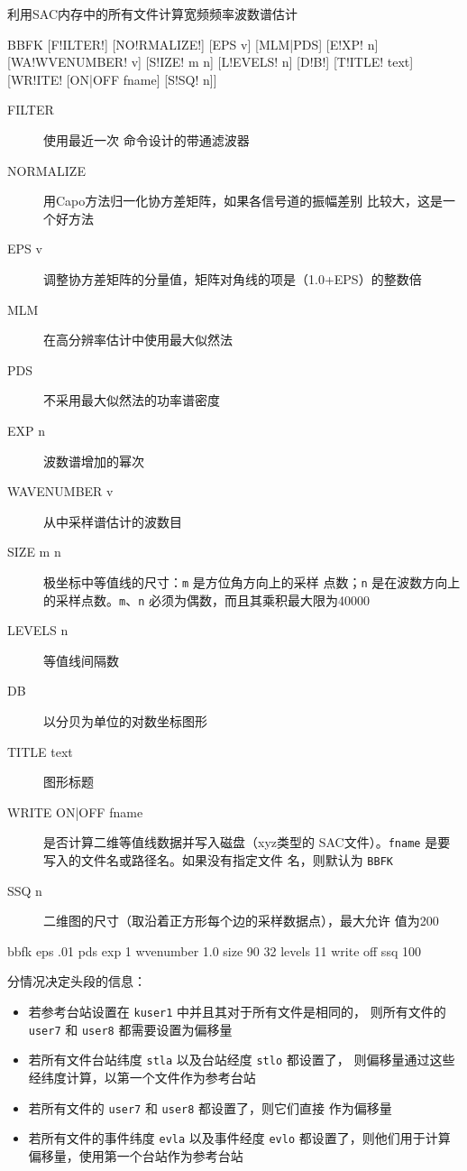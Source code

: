 \label{cmd:bbfk}

利用SAC内存中的所有文件计算宽频频率波数谱估计

\begin{SACSTX}
BBFK [F!ILTER!] [NO!RMALIZE!] [EPS v] [MLM|PDS] [E!XP! n] [WA!WVENUMBER! v]
    [S!IZE! m n] [L!EVELS! n] [D!B!] [T!ITLE! text] [WR!ITE! [ON|OFF fname] [S!SQ! n]]
\end{SACSTX}

\begin{description}
\item [FILTER] 使用最近一次 命令设计的带通滤波器
\item [NORMALIZE] 用Capo方法归一化协方差矩阵，如果各信号道的振幅差别
    比较大，这是一个好方法
\item [EPS v] 调整协方差矩阵的分量值，矩阵对角线的项是（1.0+EPS）的整数倍
\item [MLM] 在高分辨率估计中使用最大似然法
\item [PDS] 不采用最大似然法的功率谱密度
\item [EXP n] 波数谱增加的幂次
\item [WAVENUMBER v] 从中采样谱估计的波数目
\item [SIZE m n] 极坐标中等值线的尺寸：\texttt{m} 是方位角方向上的采样
    点数；\texttt{n} 是在波数方向上的采样点数。\texttt{m}、\texttt{n}
    必须为偶数，而且其乘积最大限为40000
\item [LEVELS n] 等值线间隔数
\item [DB] 以分贝为单位的对数坐标图形
\item [TITLE text] 图形标题
\item [WRITE ON|OFF fname] 是否计算二维等值线数据并写入磁盘（xyz类型的
    SAC文件）。\texttt{fname} 是要写入的文件名或路径名。如果没有指定文件
    名，则默认为 \texttt{BBFK}
\item [SSQ n] 二维图的尺寸（取沿着正方形每个边的采样数据点），最大允许
    值为200
\end{description}

\begin{SACDFT}
bbfk eps .01 pds exp 1 wvenumber 1.0 size 90 32 levels 11
    write off ssq 100
\end{SACDFT}

分情况决定头段的信息：
\begin{itemize}
\item 若参考台站设置在 \texttt{kuser1} 中并且其对于所有文件是相同的，
    则所有文件的 \texttt{user7} 和 \texttt{user8} 都需要设置为偏移量
\item 若所有文件台站纬度 \texttt{stla} 以及台站经度 \texttt{stlo} 都设置了，
    则偏移量通过这些经纬度计算，以第一个文件作为参考台站
\item 若所有文件的 \texttt{user7} 和 \texttt{user8} 都设置了，则它们直接
    作为偏移量
\item 若所有文件的事件纬度 \texttt{evla} 以及事件经度 \texttt{evlo}
    都设置了，则他们用于计算偏移量，使用第一个台站作为参考台站
\end{itemize}

